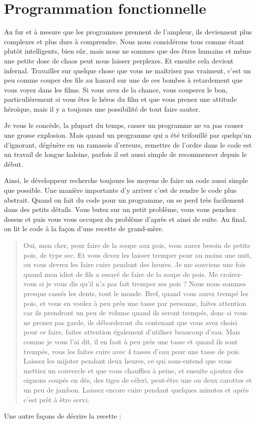\documentclass{FramateX}
\begin{document}
\chapter{Programmation fonctionnelle}

Au fur et à mesure que les programmes prennent de l'ampleur, ils
deviennent plus complexes et plus durs à comprendre. Nous nous
considérons tous comme étant plutôt intelligents, bien sûr, mais nous ne
sommes que des êtres humains et même une petite dose de chaos peut nous
laisser perplexes. Et ensuite cela devient infernal. Travailler sur
quelque chose que vous ne maîtrisez pas vraiment, c'est un peu comme
couper des fils au hasard sur une de ces bombes à retardement que vous
voyez dans les films. Si vous avez de la chance, vous couperez le bon,
particulièrement si vous êtes le héros du film et que vous prenez une
attitude héroïque, mais il y a toujours une possibilité de tout faire
sauter.

Je vous le concède, la plupart du temps, casser un programme ne va pas
causer une grosse explosion. Mais quand un programme qui a été
trifouillé par quelqu'un d'ignorant, dégénère en un ramassis d'erreurs,
remettre de l'ordre dans le code est un travail de longue haleine,
parfois il est aussi simple de recommencer depuis le début.

Ainsi, le développeur recherche toujours les moyens de faire un code
aussi simple que possible. Une manière importante d'y arriver c'est de
rendre le code plus abstrait. Quand on fait du code pour un programme,
on se perd très facilement dans des petits détails. Vous butez sur un
petit problème, vous vous penchez dessus et puis vous vous occupez du
problème d'après et ainsi de suite. Au final, on lit le code à la façon
d'une recette de grand-mère.

\begin{quote}
Oui, mon cher, pour faire de la soupe aux pois, vous aurez besoin de
petits pois, de type sec. Et vous devez les laisser tremper pour au
moins une nuit, ou vous devrez les faire cuire pendant des heures. Je me
souviens une fois quand mon idiot de fils a essayé de faire de la soupe
de pois. Me croirez-vous si je vous dis qu'il n'a pas fait tremper ses
pois ? Nous nous sommes presque cassés les dents, tout le monde. Bref,
quand vous aurez trempé les pois, et vous en voulez à peu près une tasse
par personne, faites attention car ils prendront un peu de volume quand
ils seront trempés, donc si vous ne prenez pas garde, ils déborderont du
contenant que vous avez choisi pour ce faire, faites attention également
d'utiliser beaucoup d'eau. Mais comme je vous l'ai dit, il en faut à peu
près une tasse et quand ils sont trempés, vous les faites cuire avec 4
tasses d'eau pour une tasse de pois. Laissez les mijoter pendant deux
heures, ce qui sous-entend que vous mettiez un couvercle et que vous
chauffiez à peine, et ensuite ajoutez des oignons coupés en dés, des
tiges de céleri, peut-être une ou deux carottes et un peu de jambon.
Laissez encore cuire pendant quelques minutes et après c'est prêt à être
servi.
\end{quote}
Une autre façons de décrire la recette :
\end{document}
